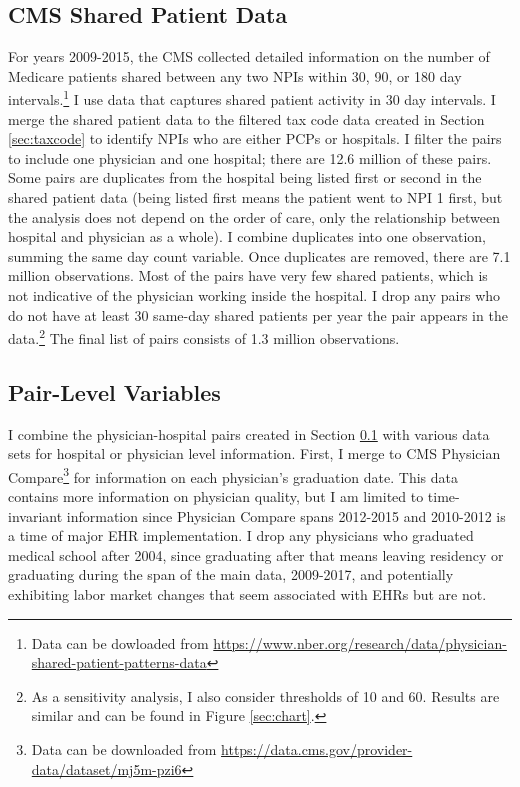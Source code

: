 \documentclass[12pt]{article}
\begin{document}
\subsection{CMS Shared Patient Data}\label{sec:sharedpat}

For years 2009-2015, the CMS collected detailed information on the number of Medicare patients shared between any two NPIs within 30, 90, or 180 day intervals.\footnote{Data can be dowloaded from \hyperlink{https://www.nber.org/research/data/physician-shared-patient-patterns-data}{https://www.nber.org/research/data/physician-shared-patient-patterns-data}} I use data that captures shared patient activity in 30 day intervals. I merge the shared patient data to the filtered tax code data created in Section \ref{sec:taxcode} to identify NPIs who are either PCPs or hospitals. I filter the pairs to include one physician and one hospital; there are 12.6 million of these pairs. Some pairs are duplicates from the hospital being listed first or second in the shared patient data (being listed first means the patient went to NPI 1 first, but the analysis does not depend on the order of care, only the relationship between hospital and physician as a whole). I combine duplicates into one observation, summing the same day count variable. Once duplicates are removed, there are 7.1 million observations. Most of the pairs have very few shared patients, which is not indicative of the physician working inside the hospital. I drop any pairs who do not have at least 30 same-day shared patients per year the pair appears in the data.\footnote{As a sensitivity analysis, I also consider thresholds of 10 and 60. Results are similar and can be found in Figure \ref{sec:chart}.} The final list of pairs consists of 1.3 million observations. 

\subsection{Pair-Level Variables}

I combine the physician-hospital pairs created in Section \ref{sec:sharedpat} with various data sets for hospital or physician level information. First, I merge to CMS Physician Compare\footnote{Data can be downloaded from \hyperlink{https://data.cms.gov/provider-data/dataset/mj5m-pzi6}{https://data.cms.gov/provider-data/dataset/mj5m-pzi6}} for information on each physician's graduation date. This data contains more information on physician quality, but I am limited to time-invariant information since Physician Compare spans 2012-2015 and 2010-2012 is a time of major EHR implementation. I drop any physicians who graduated medical school after 2004, since graduating after that means leaving residency or graduating during the span of the main data, 2009-2017, and potentially exhibiting labor market changes that seem associated with EHRs but are not. 
\end{document}
